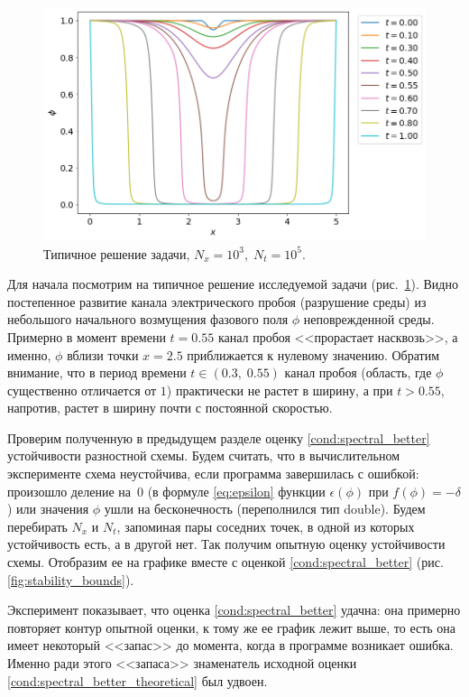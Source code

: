 \begin{figure}[!tp]
	\centering
	\includegraphics[width=\textwidth]{figures/typical_solution.png}
	\vspace{-0.8cm}
	\caption{Типичное решение задачи, $N_x = 10^3, \; N_t = 10^5$.}
	\label{fig:typical_solution}
\end{figure}

Для начала посмотрим на типичное решение исследуемой задачи (рис.~\ref{fig:typical_solution}). Видно постепенное развитие канала электрического пробоя (разрушение среды) из небольшого начального возмущения фазового поля $\phi$ неповрежденной среды. Примерно в момент времени $t = 0.55$ канал пробоя <<прорастает насквозь>>, а именно, $\phi$ вблизи точки $x = 2.5$ приближается к нулевому значению. Обратим внимание, что в период времени $t \in (0.3, \; 0.55)$ канал пробоя (область, где $\phi$ существенно отличается от $1$) практически не растет в ширину, а при $t > 0.55$, напротив, растет в ширину почти с постоянной скоростью.

Проверим полученную в предыдущем разделе оценку \eqref{cond:spectral_better} устойчивости разностной схемы. Будем считать, что в вычислительном эксперименте схема неустойчива, если программа завершилась с ошибкой: произошло деление на~$0$ (в формуле \eqref{eq:epsilon} функции $\epsilon(\phi)$ при $f(\phi) = -\delta$) или значения $\phi$ ушли на бесконечность (переполнился тип double). Будем перебирать $N_x$ и $N_t$, запоминая пары соседних точек, в одной из которых устойчивость есть, а в другой нет. Так получим опытную оценку устойчивости схемы. Отобразим ее на графике вместе с оценкой \eqref{cond:spectral_better} (рис. \ref{fig:stability_bounds}).

Эксперимент показывает, что оценка \eqref{cond:spectral_better} удачна: она примерно повторяет контур опытной оценки, к тому же ее график лежит выше, то есть она имеет некоторый <<запас>> до момента, когда в программе возникает ошибка. Именно ради этого <<запаса>> знаменатель исходной оценки  \eqref{cond:spectral_better_theoretical} был удвоен.

